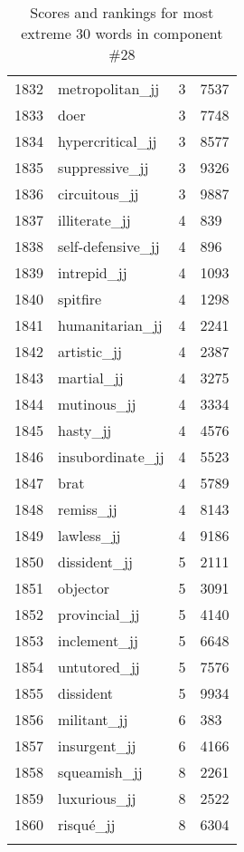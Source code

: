 \begin{longtable}[!htbp]{| rlr@{.}l |}
    1832 & metropolitan\_jj & 3 & 7537 \\
    1833 & doer & 3 & 7748 \\
    1834 & hypercritical\_jj & 3 & 8577 \\
    1835 & suppressive\_jj & 3 & 9326 \\
    1836 & circuitous\_jj & 3 & 9887 \\
    1837 & illiterate\_jj & 4 & 839 \\
    1838 & self-defensive\_jj & 4 & 896 \\
    1839 & intrepid\_jj & 4 & 1093 \\
    1840 & spitfire & 4 & 1298 \\
    1841 & humanitarian\_jj & 4 & 2241 \\
    1842 & artistic\_jj & 4 & 2387 \\
    1843 & martial\_jj & 4 & 3275 \\
    1844 & mutinous\_jj & 4 & 3334 \\
    1845 & hasty\_jj & 4 & 4576 \\
    1846 & insubordinate\_jj & 4 & 5523 \\
    1847 & brat & 4 & 5789 \\
    1848 & remiss\_jj & 4 & 8143 \\
    1849 & lawless\_jj & 4 & 9186 \\
    1850 & dissident\_jj & 5 & 2111 \\
    1851 & objector & 5 & 3091 \\
    1852 & provincial\_jj & 5 & 4140 \\
    1853 & inclement\_jj & 5 & 6648 \\
    1854 & untutored\_jj & 5 & 7576 \\
    1855 & dissident & 5 & 9934 \\
    1856 & militant\_jj & 6 & 383 \\
    1857 & insurgent\_jj & 6 & 4166 \\
    1858 & squeamish\_jj & 8 & 2261 \\
    1859 & luxurious\_jj & 8 & 2522 \\
    1860 & risqué\_jj & 8 & 6304 \\
    \hline
    \caption{Scores and rankings for most extreme 30 words in component \#28} \\
\end{longtable}
